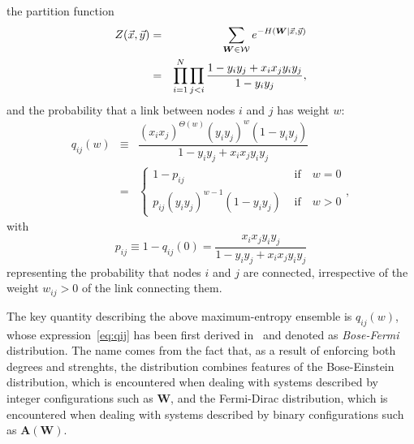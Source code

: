 \documentclass[aps,twocolumn,superscriptaddress]{revtex4-1}
\newcommand{\xxi}{x_i}
\newcommand{\xxj}{x_j}
\newcommand{\yyi}{y_i}
\newcommand{\yyj}{y_j}
\begin{document}
the partition function
\begin{eqnarray}
%
Z(\vec{x},\vec{y}) &=& \sum_{\bm{W}\in \cal{W}} e^{-H \left( \bm{W}|\vec{x},\vec{y} \right)}\\
 &=& \prod_{i=1}^N\prod_{j<i}\dfrac{1 - y_i y_j + x_i x_j y_i y_j}{1 - y_i y_j},\nonumber
\end{eqnarray}
and the probability that a link between nodes $i$ and $j$ has weight $w$:
\begin{eqnarray}
q_{ij}(w)&\equiv&\dfrac{\left( \xxi \xxj \right)^{\Theta(w)} \left( \yyi \yyj \right)^{w}  \left( 1 - \yyi \yyj \right) }{1 - \yyi \yyj + \xxi \xxj \yyi \yyj}\label{eq:qij}\\
&=&\left\{\begin{array}{ll}1-p_{ij}&\textrm{ if}\quad w=0\\
p_{ij}\left(\yyi\yyj\right)^{w-1}(1-\yyi\yyj)&\textrm{ if}\quad w>0\end{array}\right.,\nonumber
\end{eqnarray}
with 
\begin{equation}
p_{ij}\equiv1-q_{ij}(0)=\dfrac{\xxi \xxj \yyi \yyj}{1 - \yyi \yyj + \xxi \xxj \yyi \yyj}
\label{eq:pij}
\end{equation}
representing the probability that nodes $i$ and $j$ are connected, irrespective of the weight $w_{ij}>0$ of the link connecting them.
%

The key quantity describing the above maximum-entropy ensemble is $q_{ij}(w)$, whose expression~\eqref{eq:qij} has been first derived in~\cite{bose-fermi} and denoted as \emph{Bose-Fermi} distribution. The name comes from the fact that, as a result of enforcing both degrees and strenghts, the distribution combines features of the Bose-Einstein distribution, which is encountered when dealing with systems described by integer configurations such as $\bm{W}$, and the Fermi-Dirac distribution, which is encountered when dealing with systems described by binary configurations such as $\bm{A}(\bm{W})$.
\end{document}
